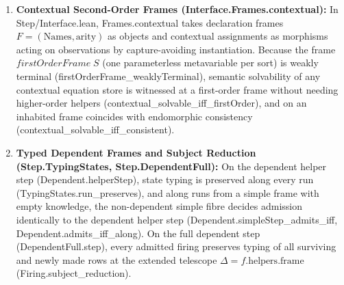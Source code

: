 \documentclass[11pt,a4paper]{article}
\theoremstyle{definition}
\DeclareRobustCommand{\lean}[1]{%
  \ifmmode\text{\normalfont\ttfamily\footnotesize\detokenize{#1}}%
  \else{\normalfont\footnotesize\leanurl{#1}}\fi}
\def\lean#1{#1}%
\begin{document}
\begin{enumerate}[leftmargin=2em, nosep]
  \item \textbf{Contextual Second-Order Frames (\lean{Interface.Frames.contextual}):}
  In \lean{Step/Interface.lean}, \lean{Frames.contextual} takes declaration frames $F = (\mathrm{Names}, \mathrm{arity})$ as objects and contextual assignments as morphisms acting on observations by capture-avoiding instantiation. Because the frame $\lean{firstOrderFrame}\;S$ (one parameterless metavariable per sort) is weakly terminal (\lean{firstOrderFrame_weaklyTerminal}), semantic solvability of any contextual equation store is witnessed at a first-order frame without needing higher-order helpers (\lean{contextual_solvable_iff_firstOrder}), and on an inhabited frame coincides with endomorphic consistency (\lean{contextual_solvable_iff_consistent}).

  \item \textbf{Typed Dependent Frames and Subject Reduction (\lean{Step.TypingStates}, \lean{Step.DependentFull}):}
  On the dependent helper step (\lean{Dependent.helperStep}), state typing is preserved along every run (\lean{TypingStates.run_preserves}), and along runs from a simple frame with empty knowledge, the non-dependent simple fibre decides admission identically to the dependent helper step (\lean{Dependent.simpleStep_admits_iff}, \lean{Dependent.admits_iff_along}). On the full dependent step (\lean{DependentFull.step}), every admitted firing preserves typing of all surviving and newly made rows at the extended telescope $\Delta = f.\mathrm{helpers}.\mathrm{frame}$ (\lean{Firing.subject_reduction}).


\end{enumerate}
\end{document}
